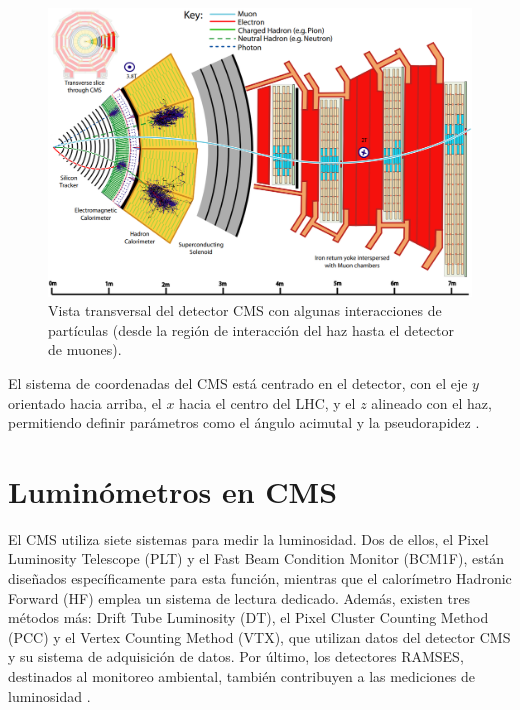 \begin{center}
  \begin{figure}[ht]
    \centering
    \includegraphics[scale=.3]{Chapter2/slice_det.png}
    \caption[Vista transversal del detector CMS.]{Vista transversal del detector CMS con algunas interacciones de partículas (desde la región de interacción del haz hasta el detector de muones).}
    \label{slice_CMS}
  \end{figure}
\end{center}

El sistema de coordenadas del CMS está centrado en el detector, con el eje $y$ orientado hacia arriba, el $x$ hacia el centro del LHC, y el $z$ alineado con el haz, permitiendo definir parámetros como el ángulo acimutal y la pseudorapidez \cite{det_summary}.\\

\section{Luminómetros en CMS}
\label{Luminometers}

El CMS utiliza siete sistemas para medir la luminosidad. Dos de ellos, el Pixel Luminosity Telescope (PLT) y el Fast Beam Condition Monitor (BCM1F), están diseñados específicamente para esta función, mientras que el calorímetro Hadronic Forward (HF) emplea un sistema de lectura dedicado. Además, existen tres métodos más: Drift Tube Luminosity (DT), el Pixel Cluster Counting Method (PCC) y el Vertex Counting Method (VTX), que utilizan datos del detector CMS y su sistema de adquisición de datos. Por último, los detectores RAMSES, destinados al monitoreo ambiental, también contribuyen a las mediciones de luminosidad \cite{pas_18}.\\

